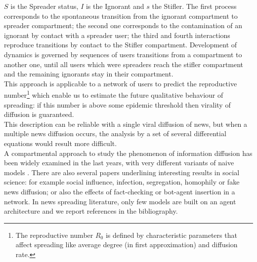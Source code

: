 $S$ is the Spreader status, $I$ is the Ignorant and $s$ the Stifler. 
The first process corresponds to the spontaneous transition from the ignorant compartment to spreader compartment;
 the second one corresponds to the contamination of an ignorant by contact with a spreader user; 
the third and fourth interactions reproduce transitions by contact to the Stifler compartment.
Development of dynamics is governed by sequences of users transitions from a compartment to another one, until all users which were spreaders reach the stifler compartment and the remaining ignorants stay in their compartment.\\
This approach is applicable to a network of users to predict the reproductive 
number\footnote{The reproductive number $R_{0}$ is defined by characteristic parameters that affect spreading like average degree (in first approximation) and diffusion rate. } 
which enable us to estimate the future qualitative behaviour of spreading: 
if this number is above some epidemic threshold then virality of diffusion is guaranteed.\\
This description can be reliable with a single viral diffusion of news, but when a
multiple news diffusion occurs, the analysis by a set of several differential equations would result more difficult.  
 \\ A compartmental approach to study the phenomenon of information diffusion has been widely examined in the last years, with very different variants of naive models \cite{barrat2008dynamical} \cite{barrat2008dynamical}\cite{barrat2008dynamical}\cite{barrat2008dynamical}\cite{barrat2008dynamical}.
There are also several papers underlining interesting results in social science: for example social influence, infection, segregation, homophily or fake news diffusion; or also the effects of fact-checking or bot-agent insertion \cite{aiello2012people} in a network.
 In news spreading literature, only few models are built on an agent architecture and we report references in the bibliography.


